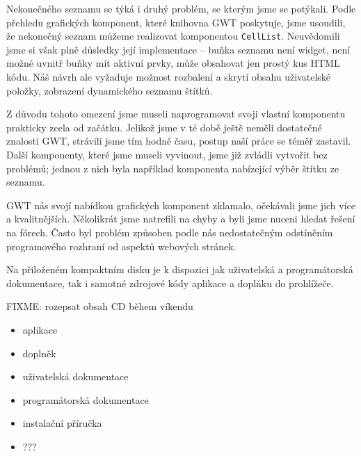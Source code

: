 Nekonečného seznamu se týká i druhý problém, se kterým jsme se potýkali.
Podle přehledu grafických komponent, které knihovna GWT poskytuje, jsme usoudili, že nekonečný seznam můžeme realizovat komponentou \verb|CellList|.
Neuvědomili jsme si však plně důsledky její implementace -- buňka seznamu není widget, není možné uvnitř buňky mít aktivní prvky, může obsahovat jen prostý kus HTML kódu.
Náš návrh ale vyžaduje možnost rozbalení a skrytí obsahu uživatelské položky, zobrazení dynamického seznamu štítků.

Z důvodu tohoto omezení jsme museli naprogramovat svoji vlastní komponentu prakticky zcela od začátku.
Jelikož jsme v té době ještě neměli dostatečné znalosti GWT, strávili jsme tím hodně času, postup naší práce se téměř zastavil.
Další komponenty, které jsme museli vyvinout, jsme již zvládli vytvořit bez problémů; jednou z nich byla například komponenta nabízející výběr štítku ze seznamu.

GWT nás svojí nabídkou grafických komponent zklamalo, očekávali jsme jich více a kvalitnějších.
Několikrát jsme natrefili na chyby a byli jsme nuceni hledat řešení na fórech.
Často byl problém způsoben podle nás nedostatečným odstíněním programového rozhraní od aspektů webových stránek.


Na přiloženém kompaktním disku je k dispozici jak uživatelská a programátorská dokumentace, tak i samotné zdrojové kódy aplikace a doplňku do prohlížeče.

FIXME: rozepsat obsah CD během víkendu

\begin{itemize}
	\item aplikace
	\item doplněk
	\item uživatelská dokumentace
	\item programátorská dokumentace
	\item instalační příručka
	\item ???
\end{itemize}
